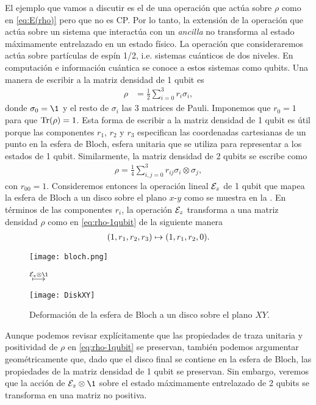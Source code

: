 El ejemplo que vamos a discutir es el de una operación que actúa 
sobre $\rho$ como en \eqref{eq:E(rho)} pero que no es CP. Por lo tanto,
la extensión de la operación que actúa sobre un sistema que interactúa con un 
\textit{ancilla} no transforma al estado máximamente entrelazado en 
un estado físico. La operación que consideraremos 
actúa sobre partículas de espín 1/2, i.e. sistemas cuánticos de
dos niveles. En computación e información cuántica
se conoce a estos sistemas como qubits. Una manera
de escribir a la matriz densidad de 1 qubit es
\begin{align}
\rho&=\frac{1}{2}\sum_{i=0}^{3} r_i\sigma_i,
\label{eq:rho-1qubit}
\end{align}
donde $\sigma_0=\1$ y el resto de $\sigma_i$ las 3 matrices de Pauli.
Imponemos que $r_0=1$ para que $\Tr(\rho)=1$.
Esta forma de escribir a la matriz densidad de 1 qubit es útil porque
las componentes $r_1$, $r_2$ y $r_3$ especifican las coordenadas 
cartesianas de un punto en la esfera de Bloch, esfera unitaria que 
se utiliza para representar a los estados de 1 qubit. Similarmente, 
la matriz densidad de 2 qubits se escribe como~\cite{nielsen_chuang_2011}
\begin{align}\label{eq:rho-2qubits}
\rho=\frac{1}{4}\sum _{i,j=0}^{3}r_{ij}\sigma_i\otimes\sigma_j,
\end{align}
con $r_{00}=1$.
Consideremos entonces la operación lineal $\mathcal{E}_z$ de 1 qubit
que mapea la esfera de Bloch a un disco sobre el plano $x$-$y$ 
como se muestra en la .
En términos de las componentes $r_i$, la operación $\mathcal{E}_z$ 
transforma a una matriz densidad $\rho$ como en 
\eqref{eq:rho-1qubit} de la siguiente manera
\begin{align}
\qty(1,r_1,r_2,r_3)\mapsto\qty(1,r_1,r_2,0).
\end{align}
\begin{figure}%
\centering
\begin{minipage}{.4\textwidth}
\centering
\texttt{[image: bloch.png]}
\end{minipage}
$\stackrel{\E_{z}\otimes\1 \vspace{1cm}}{\longmapsto}$
\begin{minipage}{0.4\textwidth}
\centering
\texttt{[image: DiskXY]}
\end{minipage}
\caption{Deformación de la esfera de Bloch a un disco sobre el plano $XY$. \ep}
\label{fig:qtm-op-motivation}
\end{figure} %
Aunque podemos revisar explícitamente que las propiedades 
de traza unitaria y positividad de $\rho$ en \eqref{eq:rho-1qubit}
se preservan, también podemos argumentar geométricamente
que, dado que el disco final se contiene en la esfera de Bloch, 
las propiedades de la matriz densidad de 1 qubit se preservan.
Sin embargo, veremos que la acción de $\E_z\ot \1$ 
sobre el estado máximamente entrelazado de 2 qubits 
se transforma en una matriz no positiva.

